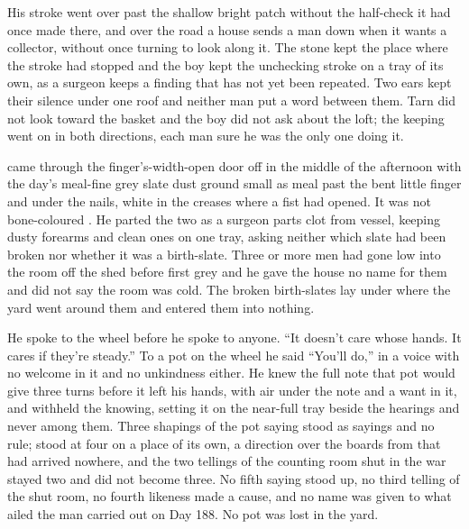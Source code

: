 His stroke went over  past the shallow bright patch without the half-check it had once made there, and over the road a house sends a man down when it wants a collector, without once turning to look along it. The stone kept the place where the stroke had stopped and the boy kept the unchecking stroke on a tray of its own, as a surgeon keeps a finding that has not yet been repeated. Two ears kept their silence under one roof and neither man put a word between them. Tarn did not look toward the basket and the boy did not ask about the loft; the keeping went on in both directions, each man sure he was the only one doing it.

\scenebreak

 came through the finger's-width-open door off  in the middle of the afternoon with the day's meal-fine grey slate dust ground small as meal past the bent little finger and under the nails, white in the creases where a fist had opened. It was not bone-coloured . He parted the two as a surgeon parts clot from vessel, keeping dusty forearms and clean ones on one tray, asking neither which slate had been broken nor whether it was a birth-slate. Three or more men had gone low into the room off the shed before first grey and he gave the house no name for them and did not say the room was cold. The broken birth-slates lay under  where the yard went around them and entered them into nothing.

He spoke to the wheel before he spoke to anyone. “It doesn't care whose hands. It cares if they're steady.” To a pot on the wheel he said “You'll do,” in a voice with no welcome in it and no unkindness either. He knew the full note that pot would give three turns before it left his hands, with air under the note and a want in it, and withheld the knowing, setting it on the near-full tray beside the hearings and never among them. Three shapings of the pot saying stood as sayings and no rule;  stood at four on a place of its own, a direction over the boards from  that had arrived nowhere, and the two tellings of the counting room shut in the war stayed two and did not become three. No fifth saying stood up, no third telling of the shut room, no fourth likeness made a cause, and no name was given to what ailed the man carried out on Day 188. No pot was lost in the yard.

